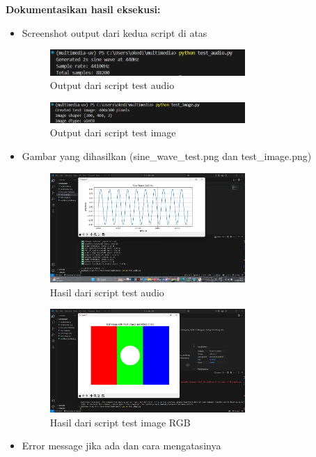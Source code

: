 \documentclass[11pt,a4paper]{article}
\begin{document}
\textbf{Dokumentasikan hasil eksekusi:}
\begin{itemize}
    \item Screenshot output dari kedua script di atas
    \begin{figure}[H]
    \centering
    \includegraphics[width=0.7\textwidth]{Figure/ss7.png}
    \caption{Output dari script test audio}
    \label{fig:contoh-gambar}
    \end{figure}
    \begin{figure}[H]
        \centering
        \includegraphics[width=0.7\textwidth]{Figure/ss9.png}
        \caption{Output dari script test image}
        \label{fig:contoh-gambar}
    \end{figure}
    \item Gambar yang dihasilkan (sine\_wave\_test.png dan test\_image.png)
    \begin{figure}[H]
        \centering
        \includegraphics[width=0.7\textwidth]{Figure/ss8.png}
        \caption{Hasil dari script test audio}
        \label{fig:sine_wave_test}
    \end{figure}
    \begin{figure}[H]
        \centering
        \includegraphics[width=0.7\textwidth]{Figure/ss10.png}
        \caption{Hasil dari script test image RGB}
        \label{fig:test_image}
    \end{figure}
    \item Error message jika ada dan cara mengatasinya
\end{itemize}
\end{document}
